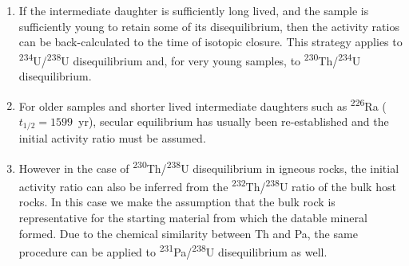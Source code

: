 \begin{refsection}
\begin{enumerate}
\item If the intermediate daughter is sufficiently long lived, and the
  sample is sufficiently young to retain some of its disequilibrium,
  then the activity ratios can be back-calculated to the time of
  isotopic closure.  This strategy applies to
  \textsuperscript{234}U/\textsuperscript{238}U disequilibrium and,
  for very young samples, to
  \textsuperscript{230}Th/\textsuperscript{234}U disequilibrium.
\item For older samples and shorter lived intermediate daughters such
  as \textsuperscript{226}Ra ($t_{1/2}=1599$~yr), secular equilibrium
  has usually been re-established and the initial activity ratio must
  be assumed.
\item However in the case of
  \textsuperscript{230}Th/\textsuperscript{238}U disequilibrium in
  igneous rocks, the initial activity ratio can also be inferred from
  the \textsuperscript{232}Th/\textsuperscript{238}U ratio of the bulk
  host rocks. In this case we make the assumption that the bulk rock
  is representative for the starting material from which the datable
  mineral formed. Due to the chemical similarity between Th and Pa,
  the same procedure can be applied to
  \textsuperscript{231}Pa/\textsuperscript{238}U disequilibrium as
  well.
\end{enumerate}


\end{refsection}
